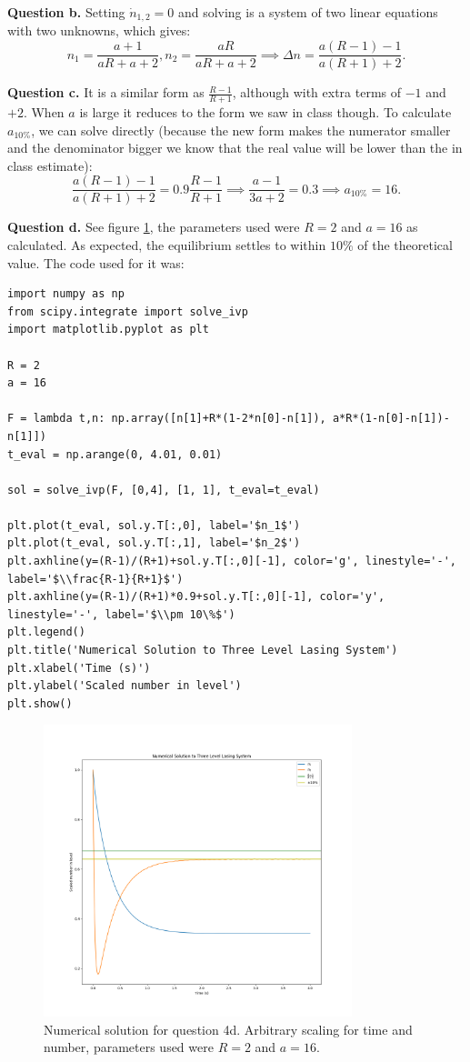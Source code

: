 \documentclass[letterpaper, reqno,11pt]{article}
\begin{document}
{\medskip\noindent\bf Question b.} Setting $\dot n_{1,2}=0$ and solving is a system of two linear equations with two unknowns, which gives:
\[
    n_1= \frac{a+1}{aR+a+2}, n_2= \frac{aR}{aR+a+2}\implies \Delta n=\frac{a(R-1)-1}{a(R+1)+2}
.\]

{\medskip\noindent\bf Question c.} It is a similar form as $\frac{R-1}{R+1}$, although with extra terms of $-1$ and $+2$. When $a$ is large it reduces to the form we saw in class though. To calculate $a_{10\%}$, we can solve directly (because the new form makes the numerator smaller and the denominator bigger we know that the real value will be lower than the in class estimate):
\[
\frac{a(R-1)-1}{a(R+1)+2}=0.9 \frac{R-1}{R+1}\implies \frac{a-1}{3a+2}=0.3\implies a_{10\%}=16
.\]

{\medskip\noindent\bf Question d.} See figure \ref{fig:q4d}, the parameters used were $R=2$ and $a=16$ as calculated. As expected, the equilibrium settles to within $10\%$ of the theoretical value. The code used for it was:
\begin{lstlisting}
import numpy as np
from scipy.integrate import solve_ivp
import matplotlib.pyplot as plt

R = 2
a = 16

F = lambda t,n: np.array([n[1]+R*(1-2*n[0]-n[1]), a*R*(1-n[0]-n[1])-n[1]])
t_eval = np.arange(0, 4.01, 0.01)

sol = solve_ivp(F, [0,4], [1, 1], t_eval=t_eval)

plt.plot(t_eval, sol.y.T[:,0], label='$n_1$')
plt.plot(t_eval, sol.y.T[:,1], label='$n_2$')
plt.axhline(y=(R-1)/(R+1)+sol.y.T[:,0][-1], color='g', linestyle='-', label='$\\frac{R-1}{R+1}$')
plt.axhline(y=(R-1)/(R+1)*0.9+sol.y.T[:,0][-1], color='y', linestyle='-', label='$\\pm 10\%$')
plt.legend()
plt.title('Numerical Solution to Three Level Lasing System')
plt.xlabel('Time (s)')
plt.ylabel('Scaled number in level')
plt.show()

\end{lstlisting}

\begin{figure}[htpb]
    \centering
    \includegraphics[width=0.8\textwidth]{q4}
    \caption{Numerical solution for question 4d. Arbitrary scaling for time and number, parameters used were $R=2$ and $a=16$.}
    \label{fig:q4d}
\end{figure}
\end{document}
